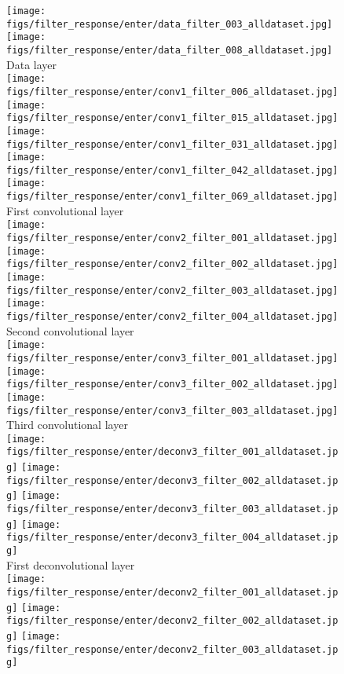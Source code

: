 \documentclass[10pt,twocolumn,letterpaper]{article}
\begin{document}
\begin{figure}[h]
	\centering
	\texttt{[image: figs/filter\_response/enter/data\_filter\_003\_alldataset.jpg]}
	\texttt{[image: figs/filter\_response/enter/data\_filter\_008\_alldataset.jpg]}\\
	{\footnotesize Data layer}\\
	\texttt{[image: figs/filter\_response/enter/conv1\_filter\_006\_alldataset.jpg]}
	\texttt{[image: figs/filter\_response/enter/conv1\_filter\_015\_alldataset.jpg]}
	\texttt{[image: figs/filter\_response/enter/conv1\_filter\_031\_alldataset.jpg]}
	\texttt{[image: figs/filter\_response/enter/conv1\_filter\_042\_alldataset.jpg]}
	\texttt{[image: figs/filter\_response/enter/conv1\_filter\_069\_alldataset.jpg]}\\
	{\footnotesize First convolutional layer}\\
	\texttt{[image: figs/filter\_response/enter/conv2\_filter\_001\_alldataset.jpg]}
	\texttt{[image: figs/filter\_response/enter/conv2\_filter\_002\_alldataset.jpg]}
	\texttt{[image: figs/filter\_response/enter/conv2\_filter\_003\_alldataset.jpg]}
	\texttt{[image: figs/filter\_response/enter/conv2\_filter\_004\_alldataset.jpg]}\\
	{\footnotesize Second convolutional layer}\\
	\texttt{[image: figs/filter\_response/enter/conv3\_filter\_001\_alldataset.jpg]}
	\texttt{[image: figs/filter\_response/enter/conv3\_filter\_002\_alldataset.jpg]}
	\texttt{[image: figs/filter\_response/enter/conv3\_filter\_003\_alldataset.jpg]}\\
	{\footnotesize Third convolutional layer}\\
	\texttt{[image: figs/filter\_response/enter/deconv3\_filter\_001\_alldataset.jpg]}
	\texttt{[image: figs/filter\_response/enter/deconv3\_filter\_002\_alldataset.jpg]}
	\texttt{[image: figs/filter\_response/enter/deconv3\_filter\_003\_alldataset.jpg]}
	\texttt{[image: figs/filter\_response/enter/deconv3\_filter\_004\_alldataset.jpg]}\\
	{\footnotesize First deconvolutional layer}\\
	\texttt{[image: figs/filter\_response/enter/deconv2\_filter\_001\_alldataset.jpg]}
	\texttt{[image: figs/filter\_response/enter/deconv2\_filter\_002\_alldataset.jpg]}
	\texttt{[image: figs/filter\_response/enter/deconv2\_filter\_003\_alldataset.jpg]}

\end{figure}
\end{document}
